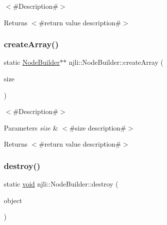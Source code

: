 $<$\#\+Description\#$>$

\begin{DoxyReturn}{Returns}
$<$\#return value description\#$>$ 
\end{DoxyReturn}
\mbox{\label{classnjli_1_1_node_builder_a11ab516128b4bd4ac95a2cae46d3b871}} 
\subsubsection{\texorpdfstring{create\+Array()}{createArray()}}
{\footnotesize\ttfamily static \mbox{\hyperlink{classnjli_1_1_node_builder}{Node\+Builder}}$\ast$$\ast$ njli\+::\+Node\+Builder\+::create\+Array (\begin{DoxyParamCaption}\item[{const \mbox{\hyperlink{_util_8h_a10e94b422ef0c20dcdec20d31a1f5049}{u32}}}]{size }\end{DoxyParamCaption})\hspace{0.3cm}{\ttfamily [static]}}

$<$\#\+Description\#$>$


\begin{DoxyParams}{Parameters}
{\em size} & $<$\#size description\#$>$\\
\hline
\end{DoxyParams}
\begin{DoxyReturn}{Returns}
$<$\#return value description\#$>$ 
\end{DoxyReturn}
\mbox{\label{classnjli_1_1_node_builder_ae48cb203c697e148be8ae96f6d4fa58e}} 
\subsubsection{\texorpdfstring{destroy()}{destroy()}}
{\footnotesize\ttfamily static \mbox{\hyperlink{_thread_8h_af1e856da2e658414cb2456cb6f7ebc66}{void}} njli\+::\+Node\+Builder\+::destroy (\begin{DoxyParamCaption}\item[{\mbox{\hyperlink{classnjli_1_1_node_builder}{Node\+Builder}} $\ast$}]{object }\end{DoxyParamCaption})\hspace{0.3cm}{\ttfamily [static]}}

